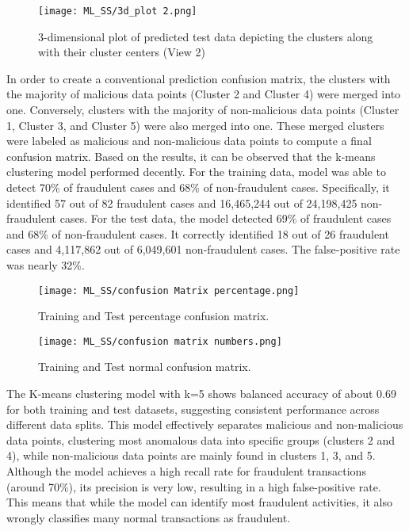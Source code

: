 \documentclass[journal]{IEEEtran}
\begin{document}
\begin{figure}[h!] %
    \centering
    \texttt{[image: ML\_SS/3d\_plot 2.png]}%
    \caption{3-dimensional plot of predicted test data depicting the clusters along with their cluster centers (View 2)}
    \label{fig:autoencoder-structure}
\end{figure}
In order to create a conventional prediction confusion matrix, the clusters with the majority of malicious data points (Cluster 2 and Cluster 4) were merged into one. Conversely, clusters with the majority of non-malicious data points (Cluster 1, Cluster 3, and Cluster 5) were also merged into one. These merged clusters were labeled as malicious and non-malicious data points to compute a final confusion matrix. Based on the results, it can be observed that the k-means clustering model performed decently. For the training data, model was able to detect 70\% of fraudulent cases and 68\% of non-fraudulent cases. Specifically, it identified 57 out of 82 fraudulent cases and 16,465,244 out of 24,198,425 non-fraudulent cases. For the test data, the model detected 69\% of fraudulent cases and 68\% of non-fraudulent cases. It correctly identified 18 out of 26 fraudulent cases and 4,117,862 out of 6,049,601 non-fraudulent cases. The false-positive rate was nearly 32\%.
\begin{figure}[h!] %
    \centering
    \texttt{[image: ML\_SS/confusion Matrix percentage.png]}%
    \caption{Training and Test percentage confusion matrix.}
    \label{fig:autoencoder-structure}
\end{figure}

\begin{figure}[h!] %
    \centering
    \texttt{[image: ML\_SS/confusion matrix numbers.png]}%
    \caption{Training and Test normal confusion matrix.}
    \label{fig:autoencoder-structure}
\end{figure}
The K-means clustering model with k=5 shows balanced accuracy of about 0.69 for both training and test datasets, suggesting consistent performance across different data splits. This model effectively separates malicious and non-malicious data points, clustering most anomalous data into specific groups (clusters 2 and 4), while non-malicious data points are mainly found in clusters 1, 3, and 5. Although the model achieves a high recall rate for fraudulent transactions (around 70\%), its precision is very low, resulting in a high false-positive rate. This means that while the model can identify most fraudulent activities, it also wrongly classifies many normal transactions as fraudulent. 
\end{document}
